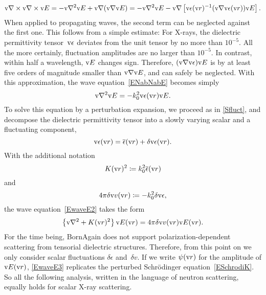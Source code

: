 %
\begin{equation}
  \text{v}{\nabla}\times\text{v}{\nabla}\times\text{v}{E}
  = - \text{v}{\nabla}^2\text{v}{E} + \text{v}{\nabla}(\text{v}{\nabla}\text{v}{E})
  = - \text{v}{\nabla}^2\text{v}{E} - \text{v}{\nabla}\left[\text{v}{\epsilon}(\text{v}{r})^{-1}(\text{v}{\nabla}\text{v}\epsilon(\text{v}{r}))\text{v}{E}\right].
\end{equation}
When applied to propagating waves, the second term can be neglected against the first one.
This follows from a simple estimate:
For X-rays, the dielectric permittivity tensor~$\text{v}{\epsilon}$
%
%
deviates from the unit tensor by no more than $10^{-5}$.
All the more certainly, fluctuation amplitudes are no larger than $10^{-5}$.
In contrast, within half a wavelength, $\text{v}{E}$ changes sign.
Therefore, $(\text{v}{\nabla}\text{v}{\epsilon})\text{v}{E}$ is by at least five orders of magnitude
smaller than $\text{v}{\nabla}\text{v}{E}$,
and can safely be neglected.
With this approximation, the wave equation~\cref{ENabNabE} becomes simply
\begin{equation}\label{EwaveE2}
  \text{v}{\nabla}^2\text{v}{E}
  = -k_0^2\text{v}{\epsilon}(\text{v}{r})\text{v}{E}.
\end{equation}
To solve this equation by a perturbation expansion,
we proceed as in \cref{Sfluct},
and decompose the dielectric permittivity tensor
into a slowly varying scalar and a fluctuating component,
\begin{equation}
  \text{v}{\epsilon}(\text{v}{r}) = \overline{\epsilon}(\text{v}{r}) + \delta\text{v}{\epsilon}(\text{v}{r}).
\end{equation}
With the additional notation
\begin{equation}
  K(\text{v}{r})^2 \coloneqq k_0^2 \overline{\epsilon}(\text{v}{r})
\end{equation}
and
\begin{equation}
  4\pi\delta\text{v}{v}(\text{v}{r}) \coloneqq - k_0^2\delta\text{v}{\epsilon},
\end{equation}
the wave equation~\cref{EwaveE2} takes the form
\begin{equation}\label{EwaveE3}
  \left\{\text{v}{\nabla}^2 + K(\text{v}{r})^2\right\}\text{v}{E}(\text{v}{r})
  = 4\pi\delta\text{v}{v}(\text{v}{r})\text{v}{E}(\text{v}{r}).
\end{equation}
For the time being,
BornAgain does not support polarization-dependent scattering
%
from tensorial dielectric structures.
Therefore, from this point on we only consider scalar fluctuations
$\delta\epsilon$ and~$\delta v$.
If we write $\psi(\text{v}{r})$ for the amplitude of $\text{v}{E}(\text{v}{r})$,
\cref{EwaveE3} replicates the perturbed Schrödinger equation~\cref{ESchrodiK}.
%
So all the following analysis,
written in the language of neutron scattering,
equally holds for scalar X-ray scattering.

